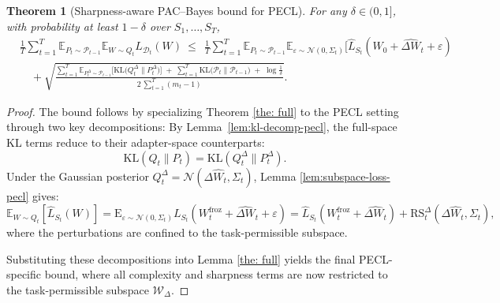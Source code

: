 \documentclass{article}
\theoremstyle{plain}
\newtheorem{theorem}{Theorem}[section]
\theoremstyle{definition}
\theoremstyle{remark}
\begin{document}
\begin{theorem}[Sharpness-aware PAC--Bayes bound for PECL]

For any $\delta\in(0,1]$, with probability at least $1-\delta$ over $S_1,\ldots,S_T$,
\begin{equation}\label{eq:pecl-main}
\begin{aligned}
&\frac{1}{T}\sum_{t=1}^T
\mathbb{E}_{P_t\sim\mathcal P_{t-1}}\mathbb{E}_{W\sim Q_t}L_{\mathcal{D}_t}(W)
\ \le\
\ \frac{1}{T}\sum_{t=1}^T
\mathbb{E}_{P_t\sim\mathcal P_{t-1}}
\mathbb{E}_{\varepsilon \sim \mathcal{N}(0, \Sigma_t)}[\hat{L}_{S_t}(W_0 + \widehat{\Delta W}_t + \varepsilon)
\\
&\quad +\sqrt{\frac{
\displaystyle \sum_{t=1}^T \mathbb{E}_{P_t^\Delta\sim\mathcal P_{t-1}}\!\Big[\mathrm{KL}\!\big(Q_t^\Delta\|P_t^\Delta\big)\Big]
\;+\;\displaystyle \sum_{t=1}^T \mathrm{KL}\!\big(\mathcal P_t\|\mathcal P_{t-1}\big)
\;+\;\log\!\frac{1}{\delta}
}{2\,\displaystyle\sum_{t=1}^T (m_t-1)}}.
\end{aligned}
\end{equation}
\end{theorem}



\begin{proof}
The bound follows by specializing Theorem \ref{the: full} to the PECL setting through two key decompositions:
By Lemma~\ref{lem:kl-decomp-pecl}, the full-space KL terms reduce to their adapter-space counterparts:
\[
\mathrm{KL}(Q_t \| P_t) = \mathrm{KL}(Q_t^\Delta \| P_t^\Delta).
\]
Under the Gaussian posterior $Q_t^\Delta = \mathcal{N}(\Delta\hat{W}_t, \Sigma_t)$, Lemma \ref{lem:subspace-loss-pecl} gives:
\[
\mathbb{E}_{W \sim Q_t}[\hat{L}_{S_t}(W)] 
= \mathrm{E}_{\varepsilon \sim \mathcal{N}(0, \Sigma_t)}{L}_{S_t}(W^{\mathrm{froz}}_t+\widehat{\Delta W}_t + \varepsilon)
 = \hat{L}_{S_t}(W^{\mathrm{froz}}_t + \widehat{\Delta{W}_t}) + \mathrm{RS}_t^\Delta(\Delta\widehat{W}_t, \Sigma_t),
\]
where the perturbations are confined to the task-permissible subspace.

Substituting these decompositions into Lemma \ref{the: full} yields the final PECL-specific bound, where all complexity and sharpness terms are now restricted to the task-permissible subspace $\mathcal{W}_\Delta$.

\end{proof}
\end{document}
